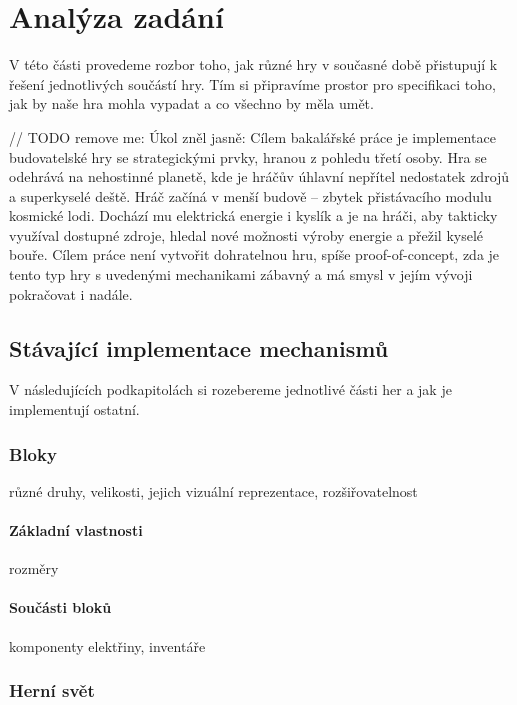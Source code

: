 
\chapter{Analýza zadání}

V této části provedeme rozbor toho, jak různé hry v současné době přistupují k řešení jednotlivých součástí hry. Tím si připravíme prostor pro specifikaci toho, jak by naše hra mohla vypadat a co všechno by měla umět.

// TODO remove me:
Úkol zněl jasně: Cílem bakalářské práce je implementace budovatelské hry se strategickými prvky, hranou z pohledu třetí osoby. Hra se odehrává na nehostinné planetě, kde je hráčův úhlavní nepřítel nedostatek zdrojů a superkyselé deště. Hráč začíná v menší budově – zbytek přistávacího modulu kosmické lodi. Dochází mu elektrická energie i kyslík a je na hráči, aby takticky využíval dostupné zdroje, hledal nové možnosti výroby energie a přežil kyselé bouře. Cílem práce není vytvořit dohratelnou hru, spíše proof-of-concept, zda je tento typ hry s uvedenými mechanikami zábavný a má smysl v jejím vývoji pokračovat i nadále.

\section{Stávající implementace mechanismů}

V následujících podkapitolách si rozebereme jednotlivé části her a jak je implementují ostatní.

\subsection{Bloky}

různé druhy, velikosti, jejich vizuální reprezentace, rozšiřovatelnost

\subsubsection{Základní vlastnosti}
rozměry

\subsubsection{Součásti bloků}
komponenty elektřiny, inventáře


\subsection{Herní svět}

